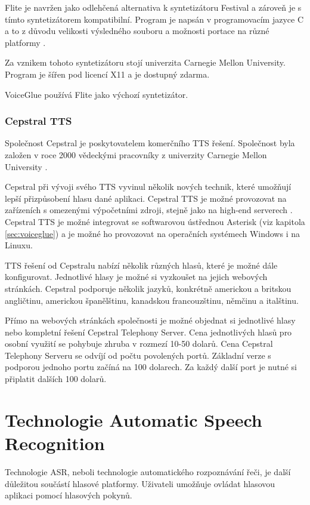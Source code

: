\documentclass[ing,male,java,dept460,twoside]{diploma}						%
\begin{document}
Flite je navržen jako odlehčená alternativa k syntetizátoru Festival a zároveň je s tímto syntetizátorem kompatibilní. Program je napsán v programovacím jazyce C a to z důvodu velikosti výsledného souboru a možnosti portace na různé platformy \cite{festvox_org}.

Za vznikem tohoto syntetizátoru stojí univerzita Carnegie Mellon University. Program je šířen pod licencí X11 a je dostupný zdarma.

VoiceGlue používá Flite jako výchozí syntetizátor.

\subsubsection{Cepstral TTS}
\label{sec:cepstral}
Společnost Cepstral je poskytovatelem komerčního TTS řešení. Společnost byla založen v roce 2000 vědeckými pracovníky z univerzity Carnegie Mellon University \cite{cepstral_wiki}.

Cepstral při vývoji svého TTS vyvinul několik nových technik, které umožňují lepší přizpůsobení hlasu dané aplikaci. Cepstral TTS je možné provozovat na zařízeních s omezenými výpočetními zdroji, stejně jako na high-end serverech \cite{cepstral_com}. Cepstral TTS je možné integrovat se softwarovou ústřednou Asterisk (viz kapitola \ref{sec:voiceglue}) a je možné ho provozovat na operačních systémech Windows i na Linuxu.

TTS řešení od Cepstralu nabízí několik různých hlasů, které je možné dále konfigurovat. Jednotlivé hlasy je možné si vyzkoušet na jejich webových stránkách. Cepstral podporuje několik jazyků, konkrétně americkou a britskou angličtinu, americkou španělštinu, kanadskou francouzštinu, němčinu a italštinu.

Přímo na webových stránkách společnosti je možné objednat si jednotlivé hlasy nebo kompletní řešení Cepstral Telephony Server. Cena jednotlivých hlasů pro osobní využití se pohybuje zhruba v rozmezí 10-50 dolarů. Cena Cepstral Telephony Serveru se odvíjí od počtu povolených portů. Základní verze s podporou jednoho portu začíná na 100 dolarech. Za každý další port je nutné si připlatit dalších 100 dolarů.

\section{Technologie Automatic Speech Recognition}
\label{sec:ASR}
Technologie ASR, neboli technologie automatického rozpoznávání řeči, je další důležitou součástí hlasové platformy. Uživateli umožňuje ovládat hlasovou aplikaci pomocí hlasových pokynů.
\end{document}
